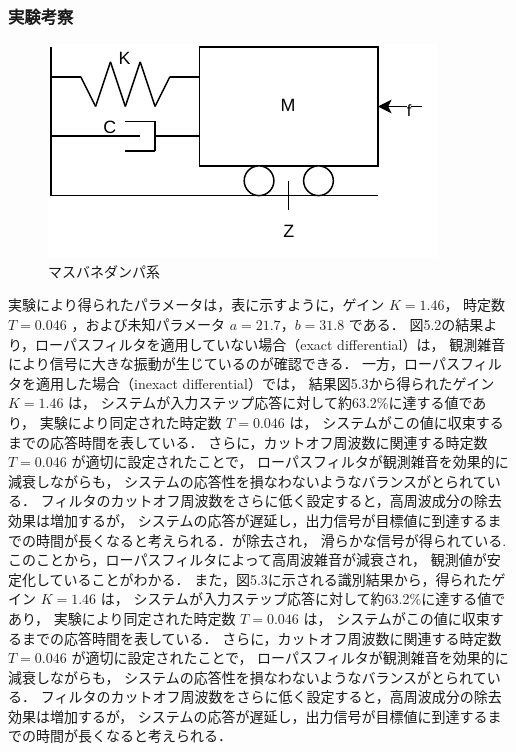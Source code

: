 \newpage

\subsubsection{実験考察}
\begin{figure}[h]
  \centering
  \includegraphics[scale=1]{sozai/6.pdf}
  \caption{マスバネダンパ系}
\end{figure}

実験により得られたパラメータは，表に示すように，ゲイン \( K = 1.46 \)，
時定数 \( T = 0.046 \) ，および未知パラメータ \( a = 21.7 \)，\( b = 31.8 \) である．
図5.2の結果より，ローパスフィルタを適用していない場合（exact differential）は，
観測雑音により信号に大きな振動が生じているのが確認できる．
一方，ローパスフィルタを適用した場合（inexact differential）では，
結果図5.3から得られたゲイン \( K = 1.46 \) は，
システムが入力ステップ応答に対して約63.2\%に達する値であり，
実験により同定された時定数 \( T = 0.046 \) は，
システムがこの値に収束するまでの応答時間を表している．
さらに，カットオフ周波数に関連する時定数 \( T = 0.046 \) が適切に設定されたことで，
ローパスフィルタが観測雑音を効果的に減衰しながらも，
システムの応答性を損なわないようなバランスがとられている．
フィルタのカットオフ周波数をさらに低く設定すると，高周波成分の除去効果は増加するが，
システムの応答が遅延し，出力信号が目標値に到達するまでの時間が長くなると考えられる．が除去され，
滑らかな信号が得られている.
このことから，ローパスフィルタによって高周波雑音が減衰され，
観測値が安定化していることがわかる．
また，図5.3に示される識別結果から，得られたゲイン \( K = 1.46 \) は，
システムが入力ステップ応答に対して約63.2\%に達する値であり，
実験により同定された時定数 \( T = 0.046 \) は，
システムがこの値に収束するまでの応答時間を表している．
さらに，カットオフ周波数に関連する時定数 \( T = 0.046 \) が適切に設定されたことで，
ローパスフィルタが観測雑音を効果的に減衰しながらも，
システムの応答性を損なわないようなバランスがとられている．
フィルタのカットオフ周波数をさらに低く設定すると，高周波成分の除去効果は増加するが，
システムの応答が遅延し，出力信号が目標値に到達するまでの時間が長くなると考えられる．


